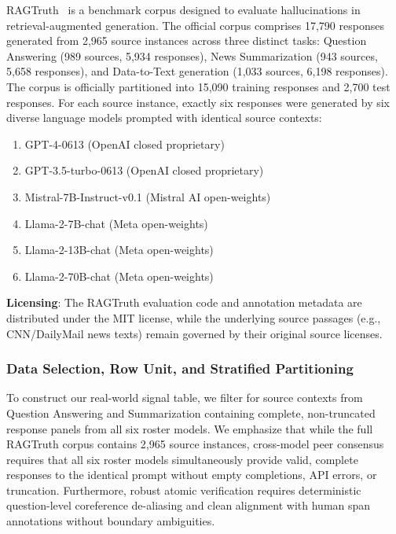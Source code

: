 \documentclass[pdflatex,sn-mathphys,Numbered]{sn-jnl}
\begin{document}
RAGTruth~\cite{niu2024ragtruth} is a benchmark corpus designed to evaluate hallucinations in retrieval-augmented generation. The official corpus comprises 17,790 responses generated from 2,965 source instances across three distinct tasks: Question Answering (989 sources, 5,934 responses), News Summarization (943 sources, 5,658 responses), and Data-to-Text generation (1,033 sources, 6,198 responses). The corpus is officially partitioned into 15,090 training responses and 2,700 test responses. For each source instance, exactly six responses were generated by six diverse language models prompted with identical source contexts:
\begin{enumerate}
    \item GPT-4-0613 (OpenAI closed proprietary)
    \item GPT-3.5-turbo-0613 (OpenAI closed proprietary)
    \item Mistral-7B-Instruct-v0.1 (Mistral AI open-weights)
    \item Llama-2-7B-chat (Meta open-weights)
    \item Llama-2-13B-chat (Meta open-weights)
    \item Llama-2-70B-chat (Meta open-weights)
\end{enumerate}

\noindent \textbf{Licensing}: The RAGTruth evaluation code and annotation metadata are distributed under the MIT license, while the underlying source passages (e.g., CNN/DailyMail news texts) remain governed by their original source licenses.

\subsubsection{Data Selection, Row Unit, and Stratified Partitioning}
To construct our real-world signal table, we filter for source contexts from Question Answering and Summarization containing complete, non-truncated response panels from all six roster models. We emphasize that while the full RAGTruth corpus contains 2,965 source instances, cross-model peer consensus requires that all six roster models simultaneously provide valid, complete responses to the identical prompt without empty completions, API errors, or truncation. Furthermore, robust atomic verification requires deterministic question-level coreference de-aliasing and clean alignment with human span annotations without boundary ambiguities. 
\end{document}
